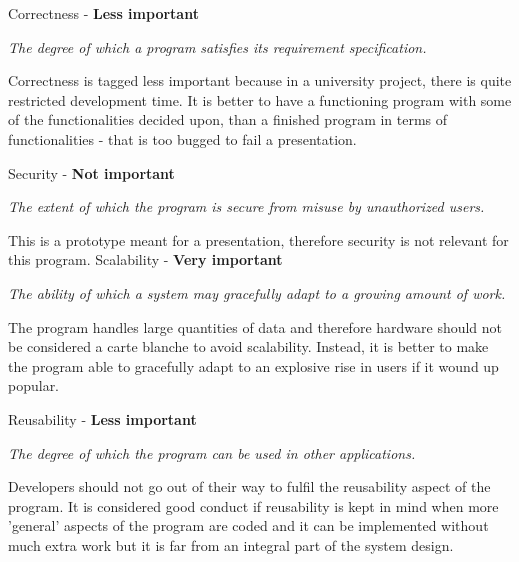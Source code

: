 \vspace{5 mm}
\noindent
Correctness - \textbf{Less important}

\vspace{5 mm}
\noindent
\textit{The degree of which a program satisfies its requirement specification.}

\vspace{5 mm}
\noindent
Correctness is tagged less important because in a university project, there is quite
restricted development time. It is better to have a functioning program with some of the
functionalities decided upon, than a finished program in terms of functionalities - that is
too bugged to fail a presentation.

\vspace{5 mm}
\noindent
Security - \textbf{Not important}

\vspace{5 mm}
\noindent
\textit{The extent of which the program is secure from misuse by unauthorized users.}

\vspace{5 mm}
\noindent
This is a prototype meant for a presentation, therefore security is not relevant for this
program.
\newpage
Scalability - \textbf{Very important}

\vspace{5 mm}
\noindent
\textit{The ability of which a system may gracefully adapt to a growing amount of work.}

\vspace{5 mm}
\noindent
The program handles large quantities of data and therefore hardware should not be
considered a carte blanche to avoid scalability. Instead, it is better to make the program
able to gracefully adapt to an explosive rise in users if it wound up popular.

\vspace{5 mm}
\noindent
Reusability - \textbf{Less important}

\vspace{5 mm}
\noindent
\textit{The degree of which the program can be used in other applications.}

\vspace{5 mm}
\noindent
Developers should not go out of their way to fulfil the reusability aspect of the program.
It is considered good conduct if reusability is kept in mind when more 'general' aspects of
the program are coded and it can be implemented without much extra work but it is far from
an integral part of the system design.

